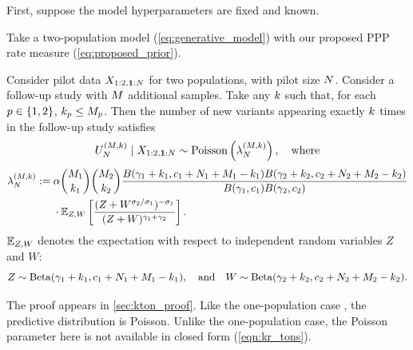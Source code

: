 First, suppose the model hyperparameters are fixed and known.

\begin{myProposition}
	
	\label{prop:predict_kr_tons}
	Take a two-population model (\cref{eq:generative_model}) with our proposed PPP rate measure (\cref{eq:proposed_prior}).
	
	Consider pilot data $\pilotdata$ for two populations, with pilot size $\vecsamplesize$. Consider a follow-up study with $\vecfuturesamplesize$ additional samples.
	Take any $\vecoccurrence$ such that, for each $p \in \{1,2\}$, $k_{p} \le M_{p}$.
	Then the number of new variants appearing exactly $\vecoccurrence$ times in the follow-up study satisfies 
	\begin{align*}
		\genericfreqnews \mid \pilotdata \sim \Poisson\left(\genericfreqnewsparam\right), \quad \textrm{where}
	\end{align*}  
	\begin{align}
		\genericfreqnewsparam := {} &\mass \binom{\futuresamplesize{1}}{\occurrence{1}} \binom{\futuresamplesize{2}}{\occurrence{2}}\frac{B(\corr{1}+\occurrence{1},\conc{1}+\samplesize{1}+\futuresamplesize{1}-\occurrence{1})B(\corr{2}+\occurrence{2},\conc{2}+\samplesize{2}+\futuresamplesize{2}-\occurrence{2})}{B(\corr{1},\conc{1})B(\corr{2},\conc{2})} \nonumber \\
    				& {} \cdot \E_{Z,W}\left[\frac{(Z+W^{\rate{2}/\rate{1}})^{-\rate{1}}}{(Z+W)^{\corr{1}+\corr{2}}}\right].
    		 		\label{eqn:kr_tons}
	\end{align}
$\mathbb{E}_{Z,W}$ denotes the expectation with respect to independent random variables $Z$ and $W$:
\begin{equation*}
    Z\sim \mathrm{Beta}(\gamma_{1}+k_{1},c_{1}+N_{1}+M_{1}-k_{1}), \quad \text{and} \quad
    W\sim \mathrm{Beta}(\gamma_{2}+k_{2},c_{2}+N_{2}+M_{2}-k_{2}).
\end{equation*}
\end{myProposition}
The proof appears in \cref{sec:kton_proof}. Like the one-population case \citep{Masoero2022},
the predictive distribution is Poisson. Unlike the one-population case,
the Poisson parameter here is not available in closed form (\cref{eqn:kr_tons}).


